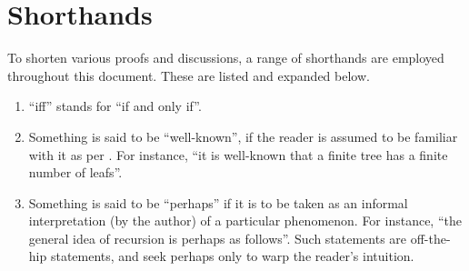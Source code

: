 \section{Shorthands} \label{sec:introduction:shorthands}

To shorten various proofs and discussions, a range of shorthands are employed
throughout this document. These are listed and expanded below.

\begin{enumerate}

\item ``iff'' stands for ``if and only if''.

\item Something is said to be ``well-known'', if the reader is assumed to be
familiar with it as per . For instance, ``it is
well-known that a finite tree has a finite number of leafs''. 

\item Something is said to be ``perhaps'' if it is to be taken as an informal
interpretation (by the author) of a particular phenomenon. For instance, ``the
general idea of recursion is perhaps as follows''. Such statements are
off-the-hip statements, and seek perhaps only to warp the reader's
intuition.

\end{enumerate}
